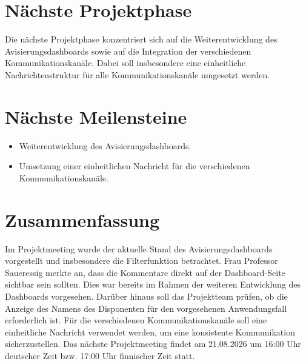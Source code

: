 \documentclass[a4paper,11pt]{article}
\begin{document}
\vspace{0.5cm}

\section{Nächste Projektphase}

Die nächste Projektphase konzentriert sich auf die Weiterentwicklung des Avisierungsdashboards sowie auf die Integration der verschiedenen Kommunikationskanäle. Dabei soll insbesondere eine einheitliche Nachrichtenstruktur für alle Kommunikationskanäle umgesetzt werden.

\vspace{0.5cm}

\section{Nächste Meilensteine}

\begin{itemize}[leftmargin=1.2cm]

\item Weiterentwicklung des Avisierungsdashboards.

\item Umsetzung einer einheitlichen Nachricht für die verschiedenen Kommunikationskanäle.

\end{itemize}

\vspace{1cm}

\section{Zusammenfassung}

Im Projektmeeting wurde der aktuelle Stand des Avisierungsdashboards vorgestellt und insbesondere die Filterfunktion betrachtet. Frau Professor Saueressig merkte an, dass die Kommentare direkt auf der Dashboard-Seite sichtbar sein sollten. Dies war bereits im Rahmen der weiteren Entwicklung des Dashboards vorgesehen. Darüber hinaus soll das Projektteam prüfen, ob die Anzeige des Namens des Disponenten für den vorgesehenen Anwendungsfall erforderlich ist. Für die verschiedenen Kommunikationskanäle soll eine einheitliche Nachricht verwendet werden, um eine konsistente Kommunikation sicherzustellen. Das nächste Projektmeeting findet am 21.08.2026 um 16:00 Uhr deutscher Zeit bzw. 17:00 Uhr finnischer Zeit statt.
\end{document}
